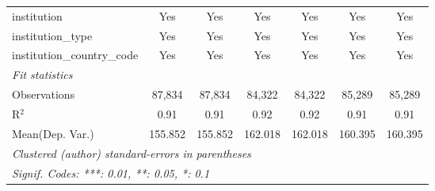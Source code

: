 \begin{tabular}{lcccccc}
   institution                        & Yes    & Yes     & Yes    & Yes     & Yes    & Yes\\  
   institution\_type                  & Yes    & Yes     & Yes    & Yes     & Yes    & Yes\\  
   institution\_country\_code         & Yes    & Yes     & Yes    & Yes     & Yes    & Yes\\  
   \midrule
   \emph{Fit statistics}\\
   Observations                       & 87,834 & 87,834  & 84,322 & 84,322  & 85,289 & 85,289\\  
   R$^2$                              & 0.91   & 0.91    & 0.92   & 0.92    & 0.91   & 0.91\\  
Mean(Dep. Var.) & 155.852 & 155.852 & 162.018 & 162.018 & 160.395 & 160.395 \\
   \midrule \midrule
   \multicolumn{7}{l}{\emph{Clustered (author) standard-errors in parentheses}}\\
   \multicolumn{7}{l}{\emph{Signif. Codes: ***: 0.01, **: 0.05, *: 0.1}}\\
\end{tabular}
\par\endgroup
